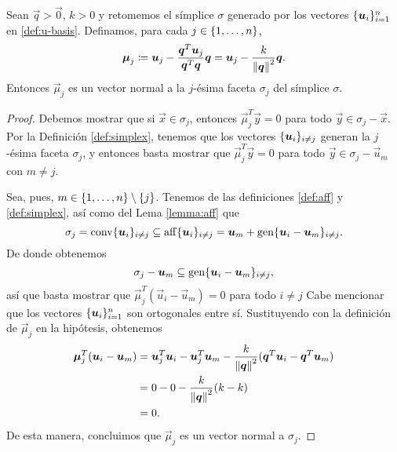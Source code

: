 \begin{lemma}
	\label{mu:orth}
	Sean $\vec{q} > \vec{0}$, $k > 0$ y retomemos el símplice $\sigma$ generado por los vectores
	$\lbrace \boldsymbol{u}_i \rbrace_{i=1}^{n}$ en \eqref{def:u-basis}. Definamos, para cada $j \in \lbrace 1,
	\ldots, n \rbrace$,
	\begin{equation}
		\label{eq:normal}
		\boldsymbol{\mu}_j \coloneq \boldsymbol{u}_j - \frac{\boldsymbol{q}^T\boldsymbol{u}_j}{\boldsymbol{q}^T\boldsymbol{q}}\boldsymbol{q}
		= \boldsymbol{u}_j - \frac{k}{\left\lVert \boldsymbol{q} \right\rVert^2}\boldsymbol{q}.
	\end{equation}
	Entonces $\vec{\mu}_j$ es un vector normal a la $j$-ésima faceta $\sigma_j$ del símplice
	$\sigma$.
\end{lemma}
\begin{proof}
	Debemos mostrar que si $\vec{x} \in \sigma_j$, entonces $\vec{\mu}_j^T\vec{y} = 0$ para todo
	$\vec{y} \in \sigma_j - \vec{x}$. Por la Definición \ref{def:simplex}, tenemos que los vectores
	$\lbrace \boldsymbol{u}_i \rbrace_{i \neq j}$ generan la $j$-ésima faceta $\sigma_j$, y entonces basta mostrar
	que $\vec{\mu}_j^T\vec{y} = 0$ para todo $\vec{y} \in \sigma_j - \vec{u}_m$ con $m \neq j$.

	Sea, pues, $m \in \lbrace 1, \ldots, n \rbrace \setminus \lbrace j \rbrace$. Tenemos de las definiciones
	\ref{def:aff} y \ref{def:simplex}, así como del Lema \ref{lemma:aff} que
	\begin{equation*}
		\sigma_j = \operatorname{conv}\lbrace \boldsymbol{u}_i \rbrace_{i \neq j} \subseteq
		\operatorname{aff}\lbrace \boldsymbol{u}_i \rbrace_{i \neq j}
		= \boldsymbol{u}_m + \operatorname{gen}\lbrace \boldsymbol{u}_i - \boldsymbol{u}_m \rbrace_{i \neq j}.
	\end{equation*}
	De donde obtenemos
	\begin{equation*}
		\sigma_j - \boldsymbol{u}_m \subseteq \operatorname{gen}\lbrace \boldsymbol{u}_i - \boldsymbol{u}_m \rbrace_{i \neq j},
	\end{equation*}
	así que basta mostrar que $\vec{\mu}_j^T(\vec{u}_i - \vec{u}_m) = 0$ para todo $i \neq j$ Cabe
	mencionar que los vectores $\lbrace \boldsymbol{u}_i \rbrace_{i=1}^{n}$ son ortogonales entre sí. Sustituyendo
	con la definición de $\vec{\mu}_j$ en la hipótesis, obtenemos
	\begin{align*}
		\boldsymbol{\mu}_j^T(\boldsymbol{u}_i - \boldsymbol{u}_m)
		&=
		\boldsymbol{u}_j^T\boldsymbol{u}_i - \boldsymbol{u}_j^T\boldsymbol{u}_m - \frac{k}{\left\lVert \boldsymbol{q} \right\rVert^2}(\boldsymbol{q}^T\boldsymbol{u}_i
		- \boldsymbol{q}^T\boldsymbol{u}_m) \\
		&= 0 - 0 -\frac{k}{\left\lVert \boldsymbol{q} \right\rVert^2}(k - k) \\
		&= 0.
	\end{align*}
	De esta manera, concluimos que $\vec{\mu}_j$ es un vector normal a $\sigma_j$.
\end{proof}

